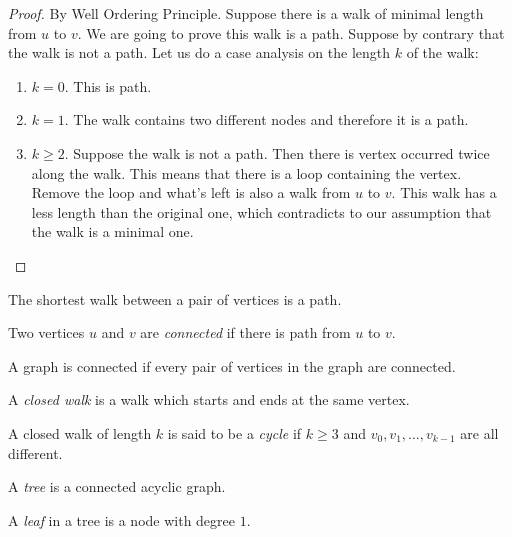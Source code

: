\documentclass[11pt]{article}
\begin{document}
\begin{proof}
By Well Ordering Principle. Suppose there is a walk of minimal length from $u$ to $v$. We are going
to prove this walk is a path. Suppose by contrary that the walk is not a path. Let us do a case
analysis on the length $k$ of the walk:
\begin{enumerate}
\item $k=0$. This is path.
\item $k=1$. The walk contains two different nodes and therefore it is a path.
\item $k \geq 2$. Suppose the walk is not a path. Then there is vertex occurred twice along the walk.
This means that there is a loop containing the vertex. Remove the loop and what's left is also a walk
from $u$ to $v$. This walk has a less length than the original one, which contradicts to our
assumption that the walk is a minimal one.
\end{enumerate}
\end{proof}

\begin{corollary}
The shortest walk between a pair of vertices is a path.
\end{corollary}

\begin{definition}
Two vertices $u$ and $v$ are \emph{connected} if there is path from $u$ to $v$.
\end{definition}

\begin{definition}
A graph is connected if every pair of vertices in the graph are connected.
\end{definition}

\begin{definition}
A \emph{closed walk} is a walk which starts and ends at the same vertex.
\end{definition}

\begin{definition}
A closed walk of length $k$ is said to be a \emph{cycle} if $k \geq 3$ and $v_0,v_1,\dots,v_{k-1}$
are all different.
\end{definition}

\begin{definition}
A \emph{tree} is a connected acyclic graph.
\end{definition}

\begin{definition}
A \emph{leaf} in a tree is a node with degree $1$.
\end{definition}
\end{document}
